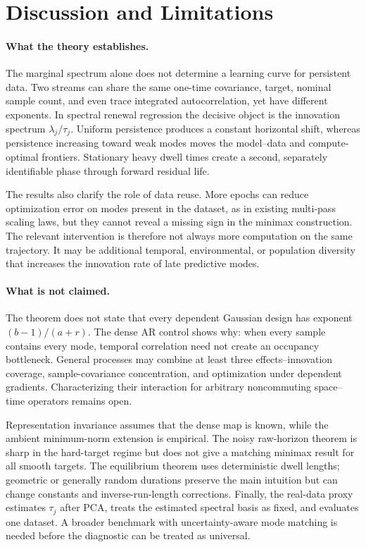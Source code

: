 \section{Discussion and Limitations}

\paragraph{What the theory establishes.}
The marginal spectrum alone does not determine a learning curve for persistent
data.  Two streams can share the same one-time covariance, target, nominal
sample count, and even trace integrated autocorrelation, yet have different
exponents.  In spectral renewal regression the decisive object is the
innovation spectrum $\lambda_j/\tau_j$.  Uniform persistence produces a
constant horizontal shift, whereas persistence increasing toward weak modes
moves the model--data and compute-optimal frontiers.  Stationary heavy dwell
times create a second, separately identifiable phase through forward residual
life.

The results also clarify the role of data reuse.  More epochs can reduce
optimization error on modes present in the dataset, as in existing multi-pass
scaling laws, but they cannot reveal a missing sign in the minimax construction.
The relevant intervention is therefore not always more computation on the same
trajectory.  It may be additional temporal, environmental, or population
diversity that increases the innovation rate of late predictive modes.

\paragraph{What is not claimed.}
The theorem does not state that every dependent Gaussian design has exponent
$(b-1)/(a+r)$.  The dense AR control shows why: when every sample contains every
mode, temporal correlation need not create an occupancy bottleneck.  General
processes may combine at least three effects--innovation coverage,
sample-covariance concentration, and optimization under dependent gradients.
Characterizing their interaction for arbitrary noncommuting space--time
operators remains open.

Representation invariance assumes that the dense map is known, while the
ambient minimum-norm extension is empirical.  The noisy raw-horizon theorem is
sharp in the hard-target regime but does not give a matching minimax result for
all smooth targets.  The equilibrium theorem uses deterministic dwell lengths;
geometric or generally random durations preserve the main intuition but can
change constants and inverse-run-length corrections.  Finally, the real-data
proxy estimates $\tau_j$ after PCA, treats the estimated spectral basis as
fixed, and evaluates one dataset.  A broader benchmark with uncertainty-aware
mode matching is needed before the diagnostic can be treated as universal.

